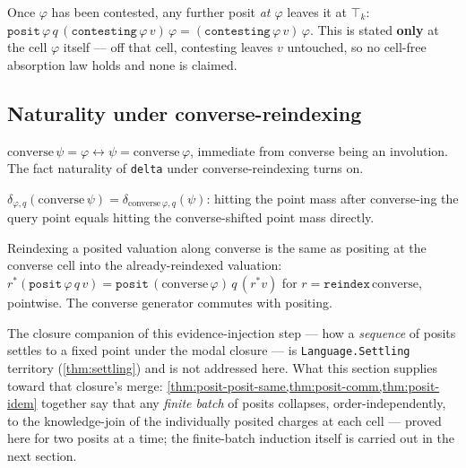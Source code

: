 \begin{theorem}\label{thm:contest-absorbs}\leanok{}
Once \(\varphi\) has been contested, any further posit \emph{at \(\varphi\)}
leaves it at \(\top_k\): \(\texttt{posit}\,\varphi\,q\,(\texttt{contesting}\,\varphi\,v)\,\varphi
= (\texttt{contesting}\,\varphi\,v)\,\varphi\). This is stated \textbf{only}
at the cell \(\varphi\) itself --- off that cell, contesting leaves \(v\)
untouched, so no cell-free absorption law holds and none is claimed.
\end{theorem}

\subsection*{Naturality under converse-reindexing}

\begin{proposition}\label{thm:claim-converse-eq-iff}\leanok{}
\(\mathrm{converse}\,\psi = \varphi \leftrightarrow \psi =
\mathrm{converse}\,\varphi\), immediate from converse being an involution.
The fact naturality of \texttt{delta} under converse-reindexing turns on.
\end{proposition}

\begin{theorem}\label{thm:delta-converse}\leanok{}
\(\delta_{\varphi,q}(\mathrm{converse}\,\psi) = \delta_{\mathrm{converse}\,\varphi,q}(\psi)\):
hitting the point mass after converse-ing the query point equals hitting the
converse-shifted point mass directly.
\end{theorem}

\begin{theorem}\label{thm:posit-converse-natural}\leanok{}
Reindexing a posited valuation along converse is the same as positing at the
converse cell into the already-reindexed valuation:
\(r^{*}(\texttt{posit}\,\varphi\,q\,v) = \texttt{posit}\,(\mathrm{converse}\,\varphi)\,q\,(r^{*}v)\)
for \(r = \texttt{reindex}\,\mathrm{converse}\), pointwise. The converse
generator commutes with positing.
\end{theorem}

The closure companion of this evidence-injection step --- how a
\emph{sequence} of posits settles to a fixed point under the modal closure
--- is \texttt{Language.Settling} territory (\cref{thm:settling}) and is not
addressed here. What this section supplies toward that closure's merge:
\cref{thm:posit-posit-same,thm:posit-comm,thm:posit-idem} together say that
any \emph{finite batch} of posits collapses, order-independently, to the
knowledge-join of the individually posited charges at each cell --- proved
here for two posits at a time; the finite-batch induction itself is carried
out in the next section.
